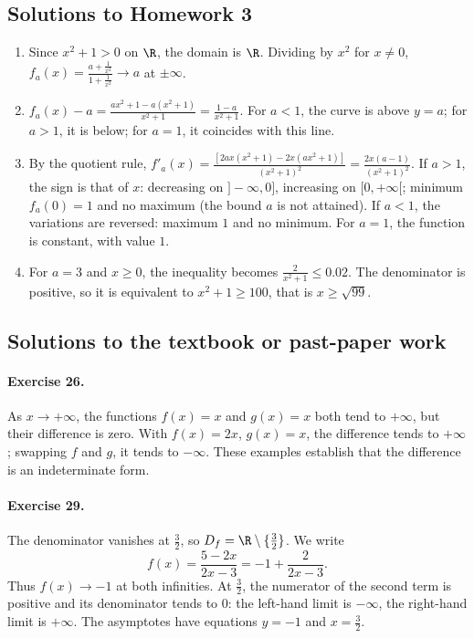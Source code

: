 \subsection{Solutions to Homework 3}\begin{enumerate}
\item Since $x^2+1>0$ on $\R$, the domain is $\R$. Dividing by $x^2$ for $x\ne0$, $f_a(x)=\frac{a+\frac{1}{x^2}}{1+\frac{1}{x^2}}\to a$ at $\pm\infty$.
\item $f_a(x)-a=\frac{ax^2+1-a(x^2+1)}{x^2+1}=\frac{1-a}{x^2+1}$. For $a<1$, the curve is above $y=a$; for $a>1$, it is below; for $a=1$, it coincides with this line.
\item By the quotient rule, $f'_a(x)=\frac{[2ax(x^2+1)-2x(ax^2+1)]}{(x^2+1)^2}=\frac{2x(a-1)}{(x^2+1)^2}$.
If $a>1$, the sign is that of $x$: decreasing on $]-\infty,0]$, increasing on $[0,+\infty[$; minimum $f_a(0)=1$ and no maximum (the bound $a$ is not attained). If $a<1$, the variations are reversed: maximum $1$ and no minimum. For $a=1$, the function is constant, with value $1$.
\item For $a=3$ and $x\ge0$, the inequality becomes $\frac{2}{x^2+1}\le\num{0,02}$. The denominator is positive, so it is equivalent to $x^2+1\ge100$, that is $x\ge\sqrt{99}$.
\end{enumerate}

\subsection{Solutions to the textbook or past-paper work}\paragraph{Exercise 26.} As $x\to+\infty$, the functions $f(x)=x$ and $g(x)=x$ both tend to $+\infty$, but their difference is zero. With $f(x)=2x$, $g(x)=x$, the difference tends to $+\infty$; swapping $f$ and $g$, it tends to $-\infty$. These examples establish that the difference is an indeterminate form.
\paragraph{Exercise 29.} The denominator vanishes at $\frac32$, so $D_f=\R\setminus\{\frac32\}$. We write
\[f(x)=\frac{5-2x}{2x-3}=-1+\frac2{2x-3}.\]
Thus $f(x)\to-1$ at both infinities. At $\frac32$, the numerator of the second term is positive and its denominator tends to $0$: the left-hand limit is $-\infty$, the right-hand limit is $+\infty$. The asymptotes have equations $y=-1$ and $x=\frac32$.

\fi


